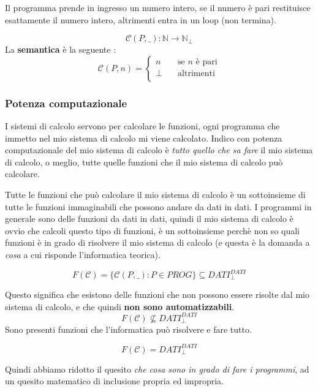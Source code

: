 \documentclass{article}
\begin{document}
Il programma prende in ingresso un numero intero, se il numero è pari restituisce
esattamente il numero intero, altrimenti entra in un loop (non termina).

$$\mathcal{C}(P,\_):\mathbb{N}\rightarrow\mathbb{N}_{\bot}$$
La \textbf{semantica} è la seguente :
\[
    \mathcal{C}(P,n) =
    \begin{cases}
        n    & \quad\text{se }n\text{ è pari} \\
        \bot & \quad\text{altrimenti}         \\
    \end{cases}
\]

\subsubsection{Potenza computazionale}
I sistemi di calcolo servono per calcolare le funzioni, ogni programma che immetto
nel mio sistema di calcolo mi viene calcolato. Indico con potenza computazionale
del mio sistema di calcolo è \textit{tutto quello che sa fare} il mio sistema di calcolo, o meglio,
tutte quelle funzioni che il mio sistema di calcolo può calcolare.

Tutte le funzioni che può calcolare il mio sistema di calcolo è un sottoinsieme
di tutte le funzioni immaginabili che possono andare da dati in dati. I programmi
in generale sono delle funzioni da dati in dati, quindi il mio sistema di calcolo
è ovvio che calcoli questo tipo di funzioni, è un sottoinsieme perchè non so quali
funzioni è in grado di risolvere il mio sistema di calcolo (e questa è la domanda
a \textit{cosa} a cui risponde l'informatica teorica).

$$F(\mathcal{C})=\{\mathcal{C}(P,\_):P\in PROG\}\subseteq DATI_{\bot}^{DATI}$$

Questo significa che esistono delle funzioni che non possono essere risolte dal mio
sistema di calcolo, e che quindi \textbf{non sono automatizzabili}.
$$F(\mathcal{C})\nsubseteq DATI_{\bot}^{DATI}$$
Sono presenti funzioni che l'informatica può risolvere e fare tutto.

$$F(\mathcal{C})=DATI_{\bot}^{DATI}$$

Quindi abbiamo ridotto il quesito \textit{che cosa sono in grado di fare i programmi},
ad un quesito matematico di inclusione propria ed impropria.
\end{document}
